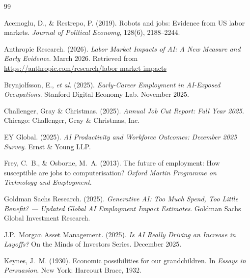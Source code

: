 \documentclass[12pt, a4paper]{article}
\begin{document}
\newpage



\begin{thebibliography}{99}

Acemoglu, D., \& Restrepo, P. (2019).
\newblock Robots and jobs: Evidence from US labor markets.
\newblock \emph{Journal of Political Economy}, 128(6), 2188--2244.

Anthropic Research. (2026).
\newblock \emph{Labor Market Impacts of AI: A New Measure and Early Evidence}.
\newblock March 2026. Retrieved from \url{https://anthropic.com/research/labor-market-impacts}

Brynjolfsson, E., \textit{et al.} (2025).
\newblock \emph{Early-Career Employment in AI-Exposed Occupations}.
\newblock Stanford Digital Economy Lab. November 2025.

Challenger, Gray \& Christmas. (2025).
\newblock \emph{Annual Job Cut Report: Full Year 2025}.
\newblock Chicago: Challenger, Gray \& Christmas, Inc.

EY Global. (2025).
\newblock \emph{AI Productivity and Workforce Outcomes: December 2025 Survey}.
\newblock Ernst \& Young LLP.

Frey, C.~B., \& Osborne, M.~A. (2013).
\newblock The future of employment: How susceptible are jobs to computerisation?
\newblock \emph{Oxford Martin Programme on Technology and Employment}.

Goldman Sachs Research. (2025).
\newblock \emph{Generative AI: Too Much Spend, Too Little Benefit? --- Updated Global AI
Employment Impact Estimates}.
\newblock Goldman Sachs Global Investment Research.

J.P.\ Morgan Asset Management. (2025).
\newblock \emph{Is AI Really Driving an Increase in Layoffs?}
\newblock On the Minds of Investors Series. December 2025.

Keynes, J.~M. (1930).
\newblock Economic possibilities for our grandchildren.
\newblock In \emph{Essays in Persuasion}. New York: Harcourt Brace, 1932.


\end{thebibliography}
\end{document}
